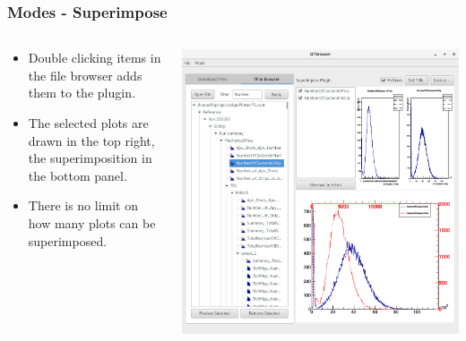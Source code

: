 \documentclass{beamer}
\begin{document}
\begin{frame}
\frametitle{Modes - Superimpose}
  \begin{columns}[T]
    \begin{column}{.5\textwidth}
     \begin{block}{}
     \begin{itemize}
     \item Double clicking items in the file browser adds them to the plugin.
     \item The selected plots are drawn in the top right, the superimposition in the bottom panel.
     \item There is no limit on how many plots can be superimposed.
     \end{itemize}
   	\end{block}	
    \end{column}
    \begin{column}{.5\textwidth}
    \begin{block}{}
    \includegraphics[width=\textwidth]{figures/superimpose_multiaxis.png}
    \end{block}
    \end{column}
  \end{columns}
\end{frame}
\end{document}
